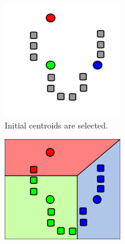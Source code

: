 \begin{figure}[ht]
    \begin{subfigure}[t]{0.2\textwidth}
        \includegraphics[width=\textwidth]{Figures/k-means/k-means_inicial_step.png}
        \caption{Initial centroids are selected.}
        \label{fig:k-means-alg:inicial_step}
    \end{subfigure}\hfill
    \begin{subfigure}[t]{0.2\textwidth}
        \includegraphics[width=\textwidth]{Figures/k-means/k-means_assignment_step.png}

\end{subfigure}
\end{figure}
